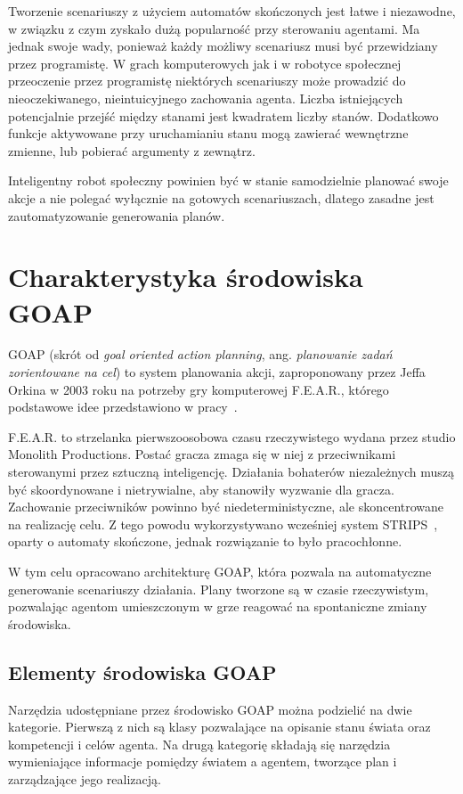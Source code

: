 Tworzenie scenariuszy z użyciem automatów skończonych jest łatwe i niezawodne, w związku z czym zyskało dużą popularność przy sterowaniu agentami. Ma jednak swoje wady, ponieważ każdy możliwy scenariusz musi być przewidziany przez programistę. W grach komputerowych jak i w robotyce społecznej przeoczenie przez programistę niektórych scenariuszy może prowadzić do nieoczekiwanego, nieintuicyjnego zachowania agenta. Liczba istniejących potencjalnie przejść między stanami jest kwadratem liczby stanów. Dodatkowo funkcje aktywowane przy uruchamianiu stanu mogą zawierać wewnętrzne zmienne, lub pobierać argumenty z zewnątrz. 

Inteligentny robot społeczny powinien być w stanie samodzielnie planować swoje akcje a nie polegać wyłącznie na gotowych scenariuszach, dlatego zasadne jest zautomatyzowanie generowania planów.

\section{Charakterystyka środowiska GOAP}
\label{sec:GOAP}
GOAP (skrót od \textit{goal oriented action planning}, ang. \textit{planowanie zadań zorientowane na cel}) to system planowania akcji, zaproponowany przez Jeffa Orkina w 2003 roku na potrzeby gry komputerowej F.E.A.R., którego podstawowe idee przedstawiono w pracy~\cite{ORKI}. 

F.E.A.R. to strzelanka pierwszoosobowa czasu rzeczywistego wydana przez studio Monolith Productions. Postać gracza zmaga się w niej z przeciwnikami sterowanymi przez sztuczną inteligencję. Działania bohaterów niezależnych muszą być skoordynowane i nietrywialne, aby stanowiły wyzwanie dla gracza. Zachowanie przeciwników powinno być niedeterministyczne, ale skoncentrowane na realizację celu. Z tego powodu wykorzystywano wcześniej system STRIPS~\cite{ORKIfear}, oparty o automaty skończone, jednak rozwiązanie to było pracochłonne. 

W tym celu opracowano architekturę GOAP, która pozwala na automatyczne generowanie scenariuszy działania. Plany tworzone są w czasie rzeczywistym, pozwalając agentom umieszczonym w grze reagować na spontaniczne zmiany środowiska.

\subsection{Elementy środowiska GOAP}
\label{subsec:GOAP_elem}

Narzędzia udostępniane przez środowisko GOAP  można podzielić na dwie kategorie. Pierwszą z nich są klasy pozwalające na opisanie stanu świata oraz kompetencji i celów agenta. Na drugą kategorię składają się narzędzia wymieniające informacje pomiędzy światem a agentem, tworzące plan i zarządzające jego realizacją. 

